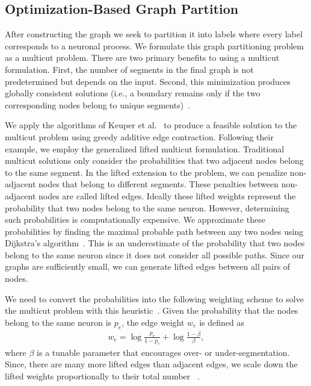 \subsection{Optimization-Based Graph Partition}

\label{sec:optimization}

After constructing the graph we seek to partition it into labels where every label corresponds to a neuronal process. 
We formulate this graph partitioning problem as a multicut problem.
There are two primary benefits to using a multicut formulation. 
First, the number of segments in the final graph is not predetermined but depends on the input. 
Second, this minimization produces globally consistent solutions (i.e., a boundary remains only if the two corresponding nodes belong to unique segments)~\cite{keuper2015efficient}.

We apply the algorithms of Keuper et al.~\cite{keuper2015efficient} to produce a feasible solution to the multicut problem using greedy additive edge contraction.
Following their example, we employ the generalized lifted multicut formulation.
Traditional multicut solutions only consider the probabilities that two adjacent nodes belong to the same segment. 
In the lifted extension to the problem, we can penalize non-adjacent nodes that belong to different segments. 
These penalties between non-adjacent nodes are called lifted edges. 
Ideally these lifted weights represent the probability that two nodes belong to the same neuron.
However, determining such probabilities is computationally expensive.
We approximate these probabilities by finding the maximal probable path between any two nodes using Dijkstra's algorithm~\cite{keuper2015efficient}.
This is an underestimate of the probability that two nodes belong to the same neuron since it does not consider all possible paths.
Since our graphs are sufficiently small, we can generate lifted edges between all pairs of nodes. 

We need to convert the probabilities into the following weighting scheme to solve the multicut problem with this heuristic~\cite{andres2011probabilistic,keuper2015efficient}.
Given the probability that the nodes belong to the same neuron is $p_e$, the edge weight $w_e$ is defined as
\begin{align}
w_e = \log{\frac{p_e}{1 - p_e}} + \log{\frac{1 - \beta}{\beta}},
\end{align}
where $\beta$ is a tunable parameter that encourages over- or under-segmentation. 
Since, there are many more lifted edges than adjacent edges, we scale down the lifted weights proportionally to their total number  
~\cite{beier2017multicut}.

